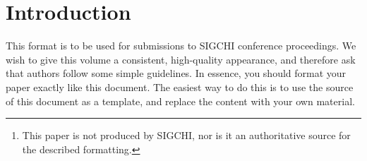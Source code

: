 \documentclass[preprint]{../latex/sigchi-modern}
\begin{document}

\maketitle

\begin{abstract}
This paper describes the formatting requirements for SIGCHI Conference
Proceedings and a few recommendations on writing for the worldwide SIGCHI
readership. It is also the documentation for the \texttt{sigchi-modern}
\LaTeX\ class for producing formatted papers.\footnote{This paper is not
produced by SIGCHI, nor is it an authoritative source for the described
formatting.}
\end{abstract}



\section{Introduction}
This format is to be used for submissions to SIGCHI conference proceedings. We
wish to give this volume a consistent, high-quality appearance, and therefore
ask that authors follow some simple guidelines. In essence, you should format
your paper exactly like this document. The easiest way to do this is to use the
source of this document as a template, and replace the content with your own
material.
\end{document}
